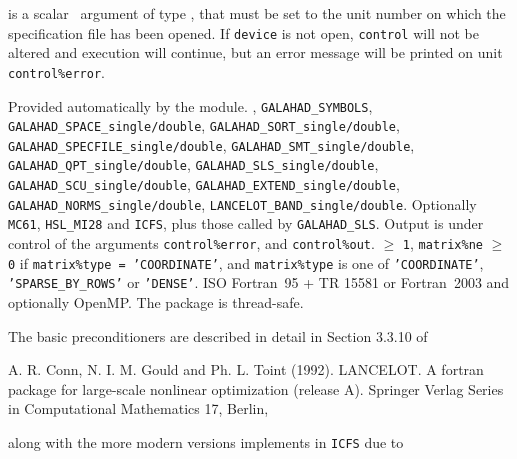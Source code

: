 \documentclass{galahad}
\begin{document}
\begin{description}

 is a scalar \intentin\ argument of type \integer,
that must be set to the unit number on which the specification file
has been opened. If {\tt device} is not open, {\tt control} will
not be altered and execution will continue, but an error message
will be printed on unit {\tt control\%error}.

\end{description}


\galgeneral

\galworkspace Provided automatically by the module.
,
{\tt GALAHAD\-\_SYMBOLS},
{\tt GALAHAD\_SPACE\_single/double},
{\tt GALAHAD\_\-SORT\-\_single/double},
{\tt GALAHAD\_SPECFILE\_single/double},
{\tt GALAHAD\_SMT\_single/double},
{\tt GALAHAD\_QPT\-\_single\-/double},
{\tt GALAHAD\_SLS\_single/double},
{\tt GALA\-HAD\_SCU\_single/double},
{\tt GALAHAD\_EXTEND\_single/double},
{\tt GALAHAD\_NORMS\_single/double},
{\tt LANCELOT\_BAND\_single/double}.
\galroutines Optionally {\tt MC61}, {\tt HSL\_MI28} and {\tt ICFS},
plus those called by {\tt GALAHAD\_SLS}.
\galio Output is under control of the arguments
{\tt control\%error},
and {\tt control\%out}.
 $\geq$ {\tt 1},
{\tt matrix\%ne} $\geq$ {\tt 0} if {\tt matrix\%type = 'COORDINATE'},
and {\tt matrix\%type} is one of
{\tt 'COORDINATE'}, {\tt 'SPARSE\_BY\_ROWS'} or   {\tt 'DENSE'}.
\galportability ISO Fortran~95 + TR 15581 or Fortran~2003 and optionally OpenMP.
The package is thread-safe.


\galmethod

\noindent
The basic preconditioners are described in detail in Section 3.3.10 of
\vspace*{1mm}

\noindent
A. R. Conn, N. I. M. Gould and Ph. L. Toint (1992).
LANCELOT. A fortran package for large-scale nonlinear optimization
(release A). Springer Verlag Series in Computational Mathematics 17,
Berlin,

\noindent
along with the more modern versions implements in {\tt ICFS} due to
\vspace*{1mm}
\end{document}
